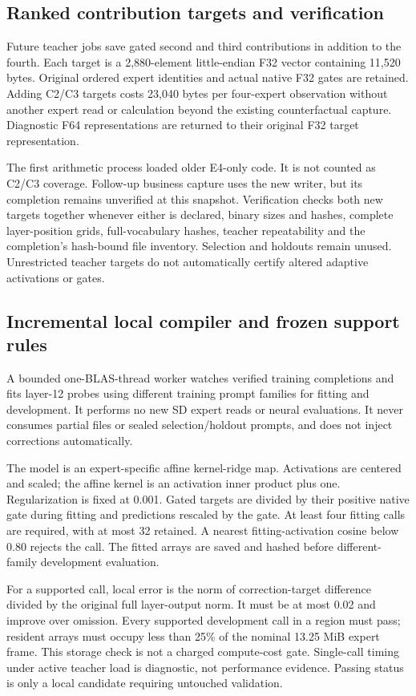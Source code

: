 \subsection{Ranked contribution targets and verification}
Future teacher jobs save gated second and third contributions in addition to
the fourth. Each target is a 2,880-element little-endian F32 vector containing
11,520 bytes. Original ordered expert identities and actual native F32 gates
are retained. Adding C2/C3 targets costs 23,040 bytes per four-expert
observation without another expert read or calculation beyond the existing
counterfactual capture. Diagnostic F64 representations are returned to their
original F32 target representation.

The first arithmetic process loaded older E4-only code. It is not counted as
C2/C3 coverage. Follow-up business capture uses the new writer, but its
completion remains unverified at this snapshot. Verification checks both new
targets together whenever either is declared, binary sizes and hashes,
complete layer-position grids, full-vocabulary hashes, teacher repeatability
and the completion's hash-bound file inventory. Selection and holdouts remain
unused. Unrestricted teacher targets do not automatically certify altered
adaptive activations or gates.

\subsection{Incremental local compiler and frozen support rules}
A bounded one-BLAS-thread worker watches verified training completions and
fits layer-12 probes using different training prompt families for fitting
and development. It performs no new SD expert reads or neural evaluations.
It never consumes partial files or sealed selection/holdout prompts, and does
not inject corrections automatically.

The model is an expert-specific affine kernel-ridge map. Activations are
centered and scaled; the affine kernel is an activation inner product plus
one. Regularization is fixed at 0.001. Gated targets are divided by their
positive native gate during fitting and predictions rescaled by the gate.
At least four fitting calls are required, with at most 32 retained. A nearest
fitting-activation cosine below 0.80 rejects the call. The fitted arrays are
saved and hashed before different-family development evaluation.

For a supported call, local error is the norm of correction-target difference
divided by the original full layer-output norm. It must be at most 0.02 and
improve over omission. Every supported development call in a region must pass;
resident arrays must occupy less than 25\% of the nominal 13.25 MiB expert
frame. This storage check is not a charged compute-cost gate. Single-call
timing under active teacher load is diagnostic, not performance evidence.
Passing status is only a local candidate requiring untouched validation.

